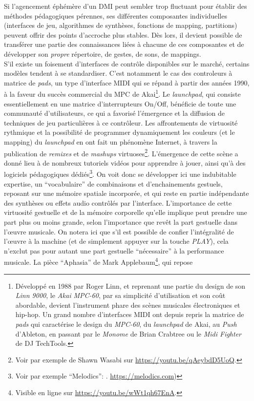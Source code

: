 \noindent Si l'agencement éphémère d'un \gls{DMI} peut sembler trop fluctuant pour établir des méthodes pédagogiques pérennes, ses différentes composantes individuelles (interfaces de jeu, algorithmes de synthèses, fonctions de mapping, partitions) peuvent offrir des points d'accroche plus stables. Dès lors, il devient possible de transférer une partie des connaissances liées à chacune de ces composantes et de développer son \textit{propre} répertoire, de gestes, de sons, de mappings.\\
\indent S'il existe un foisement d'interfaces de contrôle disponibles sur le marché, certains modèles tendent à se standardiser. C'est notamment le cas des controleurs à matrice de \textit{pads}, un type d'interface \gls{MIDI} qui se répand à partir des années 1990, à la faveur du succès commercial du MPC de Akai\footnote{Développé en 1988 par Roger Linn, et reprenant une partie du design de son \textit{Linn 9000}, le \textit{Akai MPC-60}, par sa simplicité d'utilisation et son coût abordable, devient l'instrument phare des scènes musicales électroniques et hip-hop. Un grand nombre d'interfaces \gls{MIDI} ont depuis repris la matrice de \textit{pads} qui caractérise le design du \textit{MPC-60}, du \textit{launchpad} de Akai, au \textit{Push} d'Ableton, en passant par le \textit{Monome} de Brian Crabtree ou le \textit{Midi Fighter} de DJ TechTools.}. Le \textit{launchpad}, qui consiste essentiellement en une matrice d'interrupteurs On/Off, bénéficie de toute une communauté d'utilisateurs, ce qui a favorisé l'émergence et la diffusion de techniques de jeu particulières à ce contrôleur. Les affrontements de virtuosité rythmique et la possibilité de programmer dynamiquement les couleurs (et le mapping) du \textit{launchpad} en ont fait un phénomène Internet, à travers la publication de \textit{remixes} et de \textit{mashups} virtuoses\footnote{Voir par exemple  de Shawn Wasabi sur \url{https://youtu.be/qAeybdD5UoQ}.}. L'émergence de cette scène a donné lieu à de nombreux tutoriels vidéos pour apprendre à jouer, ainsi qu'à des logiciels pédagogiques dédiés\footnote{Voir par exemple ``Melodics'': . \url{https://melodics.com})}. On voit donc se développer ici une indubitable expertise, un ``vocabulaire'' de combinaisons et d'enchainements gestuels, reposant sur une mémoire spatiale incorporée, et qui reste en partie indépendante des synthèses ou effets audio contrôlés par l'interface. L'importance de cette virtuosité gestuelle et de la mémoire corporelle qu'elle implique peut prendre une part plus ou moins grande, selon l'importance que revêt la part gestuelle dans l'œuvre musicale. On notera ici que s'il est possible de confier l'intégralité de l'œuvre à la machine (et de simplement appuyer sur la touche \textit{PLAY}), cela n'exclut pas pour autant une part gestuelle ``nécessaire'' à la performance musicale. La pièce ``Aphasia'' de Mark Applebaum\footnote{Visible en ligne sur \url{https://youtu.be/wWt1qh67EnA}.}, qui repose 